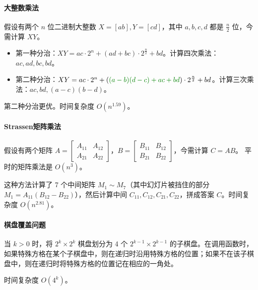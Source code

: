 \documentclass[UTF8]{ctexart}
\newcommand\Emph[1]{\textcolor{cyan!80!black}{#1}}
\begin{document}
\paragraph{大整数乘法}
假设有两个 $n$ 位二进制大整数 $X=[ab],Y=[cd]$，其中 $a,b,c,d$ 都是 $\frac n2$ 位，今需计算 $XY$。

\begin{itemize}
  \item 第一种分治：$XY = ac\cdot 2^n + (ad+bc)\cdot 2^{\frac{n}{2}} + bd$。计算四次乘法：$ac,ad,bc,bd$。
  \item 第二种分治：$XY = ac\cdot 2^n + (\textcolor{green!50!black}{(a-b)(d-c) + ac + bd})\cdot 2^{\frac n2} + bd$。计算三次乘法：$ac,bd,(a-c)(b-d)$。
\end{itemize}
第二种分治更优。\Emph{时间复杂度 $O(n^{1.59})$。}

\paragraph{Strassen矩阵乘法}
假设有两个矩阵 $A=\begin{bmatrix}
             A_{11} & A_{12} \\
             A_{21} & A_{22}
           \end{bmatrix}$，$B=\begin{bmatrix}
                               B_{11} & B_{12} \\
                               B_{21} & B_{22}
                             \end{bmatrix}$，今需计算 $C=AB$。
平时的矩阵乘法是 $O(n^3)$。

这种方法计算了 7 个中间矩阵 $M_1\sim M_7$（其中幻灯片被挡住的部分 $M_1=A_{11}(B_{12}-B_{22})$），然后计算中间 $C_{11},C_{12},C_{21},C_{22}$，拼成答案 $C$。\Emph{时间复杂度 $O(n^{2.81})$。}

\paragraph{棋盘覆盖问题}
当 $k>0$ 时，将 $2^k\times 2^k$ 棋盘划分为 4 个 $2^{k-1}\times 2^{k-1}$ 的子棋盘。在调用函数时，如果特殊方格在某个子棋盘中，则在递归时沿用特殊方格的位置；如果不在该子棋盘中，则在递归时将特殊方格的位置记在相应的一角处。

时间复杂度 $O(4^k)$。
\end{document}
